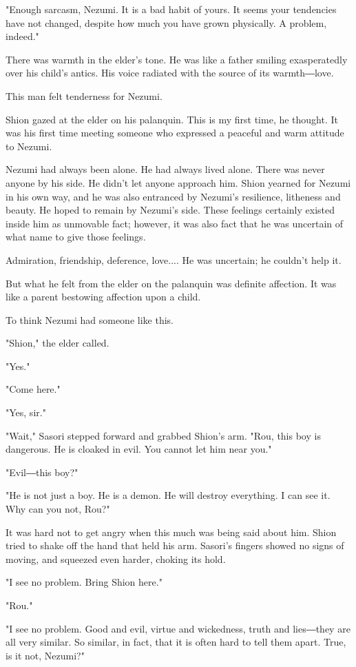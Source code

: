"Enough sarcasm, Nezumi. It is a bad habit of yours. It seems your
tendencies have not changed, despite how much you have grown physically.
A problem, indeed."

There was warmth in the elder's tone. He was like a father smiling
exasperatedly over his child's antics. His voice radiated with the
source of its warmth―love.

This man felt tenderness for Nezumi.

Shion gazed at the elder on his palanquin. This is my first time, he
thought. It was his first time meeting someone who expressed a peaceful
and warm attitude to Nezumi.

Nezumi had always been alone. He had always lived alone. There was never
anyone by his side. He didn't let anyone approach him. Shion yearned for
Nezumi in his own way, and he was also entranced by Nezumi's resilience,
litheness and beauty. He hoped to remain by Nezumi's side. These
feelings certainly existed inside him as unmovable fact; however, it was
also fact that he was uncertain of what name to give those feelings.

Admiration, friendship, deference, love.... He was uncertain; he
couldn't help it.

But what he felt from the elder on the palanquin was definite affection.
It was like a parent bestowing affection upon a child.

To think Nezumi had someone like this.

"Shion," the elder called.

"Yes."

"Come here."

"Yes, sir."

"Wait," Sasori stepped forward and grabbed Shion's arm. "Rou, this boy
is dangerous. He is cloaked in evil. You cannot let him near you."

"Evil―this boy?"

"He is not just a boy. He is a demon. He will destroy everything. I can
see it. Why can you not, Rou?"

It was hard not to get angry when this much was being said about him.
Shion tried to shake off the hand that held his arm. Sasori's fingers
showed no signs of moving, and squeezed even harder, choking its hold.

"I see no problem. Bring Shion here."

"Rou."

"I see no problem. Good and evil, virtue and wickedness, truth and
lies―they are all very similar. So similar, in fact, that it is often
hard to tell them apart. True, is it not, Nezumi?"

